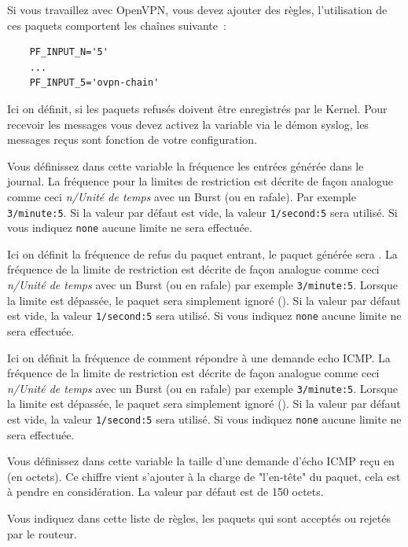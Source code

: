 \begin{description}
Si vous travaillez avec OpenVPN, vous devez ajouter des
règles, l'utilisation de ces paquets comportent les chaînes suivante~:

\begin{example}
\begin{verbatim}
    PF_INPUT_N='5'
    ...
    PF_INPUT_5='ovpn-chain'
\end{verbatim}
\end{example}

Ici on définit, si les paquets refusés doivent être enregistrés par le Kernel.
Pour recevoir les messages vous devez activez la variable 
via le démon syslog, les messages reçus sont fonction de votre configuration.

Vous définissez dans cette variable la fréquence les entrées générée dans le
journal. La fréquence pour la limites de restriction est décrite de façon
analogue comme ceci \emph{n/Unité de temps} avec un Burst (ou en rafale).
Par exemple \texttt{3/minute:5}. Si la valeur par défaut est vide, la valeur
\texttt{1/second:5} sera utilisé. Si vous indiquez \texttt{none} aucune limite
ne sera effectuée.

Ici on définit la fréquence de refus du paquet entrant, le paquet générée sera
. La fréquence de la limite de restriction est décrite de
façon analogue comme ceci \emph{n/Unité de temps} avec un Burst (ou en rafale)
par exemple \texttt{3/minute:5}. Lorsque la limite est dépassée, le paquet sera
simplement ignoré (). Si la valeur par défaut est vide, la valeur
\texttt{1/second:5} sera utilisé. Si vous indiquez \texttt{none} aucune limite
ne sera effectuée.

Ici on définit la fréquence de comment répondre à une demande echo ICMP. La
fréquence de la limite de restriction est décrite de façon analogue comme ceci
\emph{n/Unité de temps} avec un Burst (ou en rafale) par exemple \texttt{3/minute:5}.
Lorsque la limite est dépassée, le paquet sera simplement ignoré ().
Si la valeur par défaut est vide, la valeur \texttt{1/second:5} sera utilisé.
Si vous indiquez \texttt{none} aucune limite ne sera effectuée.

Vous définissez dans cette variable la taille d'une demande d'écho ICMP reçu en
(en octets). Ce chiffre vient s'ajouter à la charge de "l'en-tête" du paquet,
cela est à pendre en considération. La valeur par défaut est de 150 octets.

Vous indiquez dans cette liste de règles, les paquets qui sont acceptés ou
rejetés par le routeur.
\end{description}


